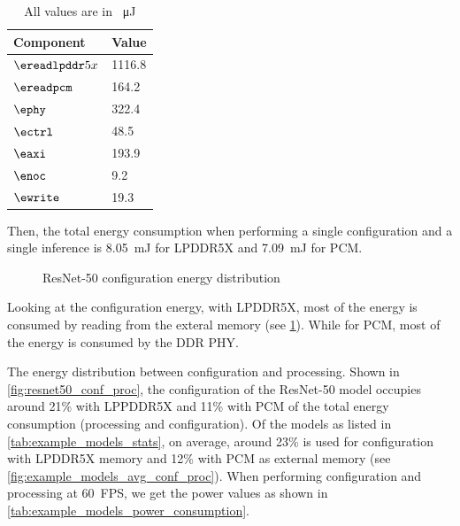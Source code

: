 \begin{table}[hbtp]
    \centering
    \begin{tabular}{@{}ll@{}}
    \toprule
    \textbf{Component} & \textbf{Value} \\
    \midrule
    $\ereadlpddr5x$ & 1116.8 \\
    $\ereadpcm$ & 164.2 \\
    $\ephy$ & 322.4 \\
    $\ectrl$ & 48.5 \\
    $\eaxi$ & 193.9 \\
    $\enoc$ & 9.2 \\
    $\ewrite$ & 19.3 \\
    \bottomrule
    \end{tabular}
    \caption{All values are in \SI{}{\micro\joule}}
    \label{tab:resnet50_energy}
\end{table}

Then, the total energy consumption when performing a single configuration and a single inference is \SI{8.05}{mJ} for LPDDR5X and \SI{7.09}{mJ} for PCM.

\begin{figure}[hbtp]
    \centering
    \hfill
    \caption{ResNet-50 configuration energy distribution}
    \label{fig:resnet50_conf_energy_distribution}
\end{figure}


Looking at the configuration energy, with LPDDR5X, most of the energy is consumed by reading from the exteral memory (see \cref{fig:resnet50_conf_energy_distribution}).
While for PCM, most of the energy is consumed by the DDR PHY.

The energy distribution between configuration and processing.
Shown in \cref{fig:resnet50_conf_proc}, the configuration of the ResNet-50 model occupies around 21\% with LPPDDR5X and 11\% with PCM of the total energy consumption (processing and configuration).
Of the models as listed in \cref{tab:example_models_stats}, on average, around 23\% is used for configuration with LPDDR5X memory and 12\% with PCM as external memory (see \cref{fig:example_models_avg_conf_proc}).
When performing configuration and processing at \SI{60}{FPS}, we get the power values as shown in \cref{tab:example_models_power_consumption}.

